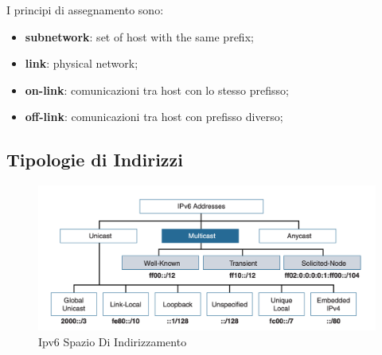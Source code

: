 \documentclass[12pt]{article}
\begin{document}
I principi di assegnamento sono:
\begin{itemize}
    \item \textbf{subnetwork}: set of host with the same prefix;
    \item \textbf{link}: physical network;
    \item \textbf{on-link}: comunicazioni tra host con lo stesso prefisso;
    \item \textbf{off-link}: comunicazioni tra host con prefisso diverso;
\end{itemize}

\subsection{Tipologie di Indirizzi}
\begin{figure}[H]
    \centering
    \includegraphics[width=1\textwidth]{ipv6-spazio-di-indirizzamento.png}
    \caption{Ipv6 Spazio Di Indirizzamento}
    \label{fig:ipv6-spazio-di-indirizzamento}
\end{figure}
\end{document}
